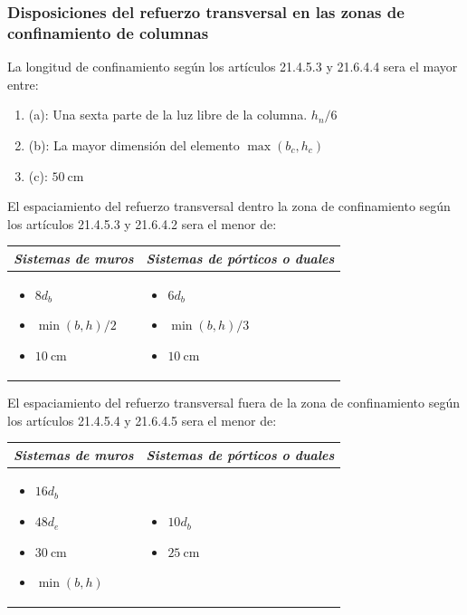 \subsubsection{Disposiciones del refuerzo transversal en las zonas de confinamiento de columnas}

La longitud de confinamiento según los artículos 21.4.5.3 y 21.6.4.4 sera el mayor entre:
\begin{enumerate}
\item[] (a): Una sexta parte de la luz libre de la columna. $h_{n}/6$
\item[] (b): La mayor dimensión del elemento $\max (b_{c},h_{c})$
\item[] (c): $50 \mathrm{~cm}$
\end{enumerate}
\noindent El espaciamiento del refuerzo transversal dentro la zona de confinamiento según los artículos 21.4.5.3 y 21.6.4.2 sera el menor de:\\
\begin{table}[h!]
\centering
\begin{tabular}{>{\arraybackslash}m{5cm}>{\arraybackslash}m{6cm}}
\hline
\textit{Sistemas de muros} & \textit{Sistemas de pórticos o duales} \\ \hline
\begin{itemize} 
\item $8d_{b}$
\item $\min (b,h)/ 2$
\item $10 \mathrm{~cm}$
\end{itemize}                  &      
 \begin{itemize} 
\item $6d_{b}$
\item $\min (b,h)/ 3$
\item $10 \mathrm{~cm}$
    \end{itemize} \\ \hline
\end{tabular}
\end{table}


\noindent
El espaciamiento del refuerzo transversal fuera de la zona de confinamiento según los artículos 21.4.5.4 y 21.6.4.5 sera el menor de:\\
\begin{table}[h!]
\centering
\begin{tabular}{>{\arraybackslash}m{5cm}>{\arraybackslash}m{6cm}}
\hline
\textit{Sistemas de muros} & \textit{Sistemas de pórticos o duales} \\ \hline
\begin{itemize} 
\item $16d_{b}$
\item $48d_{e}$
\item $30 \mathrm{~cm}$
\item $\min (b, h)$
\end{itemize}                  &      
 \begin{itemize} 
\item $10d_{b}$
\item $25 \mathrm{~cm}$
    \end{itemize} \\ \hline
\end{tabular}
\end{table}


